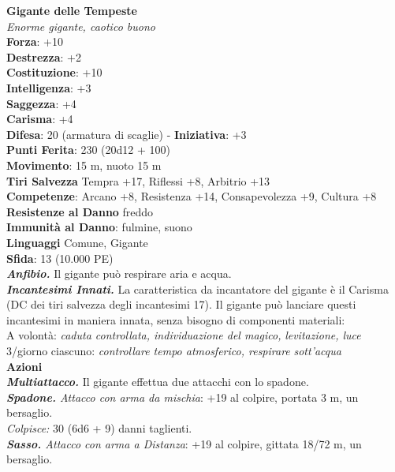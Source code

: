 \begin{multicols}{2}
\medskip\textbf{Gigante delle Tempeste}\\
\emph{Enorme gigante, caotico buono}\\
\textbf{Forza}: +10\\
\textbf{Destrezza}: +2\\
\textbf{Costituzione}: +10\\
\textbf{Intelligenza}: +3\\
\textbf{Saggezza}: +4\\
\textbf{Carisma}: +4\\
\textbf{Difesa}: 20 (armatura di scaglie) - \textbf{Iniziativa}: +3\\
\textbf{Punti Ferita}: 230 (20d12 + 100)\\
\textbf{Movimento}: 15 m, nuoto 15 m\\
\textbf{Tiri Salvezza} Tempra +17, Riflessi +8, Arbitrio +13\\
\textbf{Competenze}: Arcano +8, Resistenza +14, Consapevolezza +9, Cultura +8\\
\textbf{Resistenze al Danno} freddo\\
\textbf{Immunità al Danno}: fulmine, suono\\
\textbf{Linguaggi} Comune, Gigante\\
\textbf{Sfida}: 13 (10.000 PE)\smallskip\\
\emph{\textbf{Anfibio.}} Il gigante può respirare aria e acqua.\\
\emph{\textbf{Incantesimi Innati.}} La caratteristica da incantatore del gigante è il Carisma (DC dei tiri salvezza degli incantesimi 17). Il gigante può lanciare questi incantesimi in maniera innata, senza bisogno di componenti materiali:\\
A volontà: \emph{caduta controllata, individuazione del magico,} \emph{levitazione, luce}\\
3/giorno ciascuno: \emph{controllare tempo atmosferico, respirare} \emph{sott'acqua}\\
\smallskip\textbf{Azioni}\\
\emph{\textbf{Multiattacco.}} Il gigante effettua due attacchi con lo spadone.\\
\emph{\textbf{Spadone.} Attacco con arma da mischia}: +19 al colpire, portata 3 m, un bersaglio.\\
\emph{Colpisce:} 30 (6d6 + 9) danni taglienti.\\
\emph{\textbf{Sasso.} Attacco con arma a Distanza}: +19 al colpire, gittata 18/72 m, un bersaglio.\\

\end{multicols}
